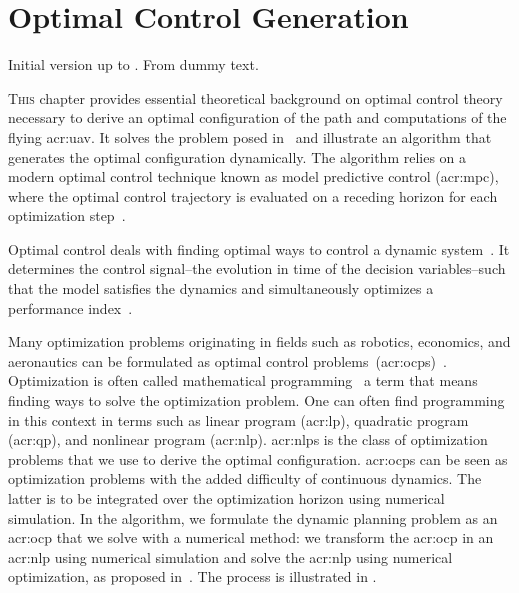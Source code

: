 
\chapter{Optimal Control Generation}
\label{cp:opt}

\begin{highlight}
    \begin{st}
        Initial version up to . From  dummy text.
    \end{st} 
\end{highlight}

\lettrine{T}{his} chapter provides essential theoretical background on optimal control theory necessary to derive an optimal configuration of the path and computations of the flying \Gls{acr:uav}. It solves the problem posed in~ and illustrate an algorithm that generates the optimal configuration dynamically. The algorithm relies on a modern optimal control technique known as model predictive control (\Gls{acr:mpc}), where the optimal control trajectory is evaluated on a receding horizon for each optimization step~\citep{rawlings2017model}. 

Optimal control deals with finding optimal ways to control a dynamic system~\citep{sethi2019optimal}. It determines the control signal--the evolution in time of the decision variables--such that the model satisfies the dynamics and simultaneously optimizes a performance index~\citep{kirk2004optimal}.

Many optimization problems originating in fields such as robotics, economics, and aeronautics can be formulated as optimal control problems~(\Gls{acr:ocp}s)~\citep{von1992direct}. Optimization is often called mathematical programming~\citep{nocedal2006numerical} a term that means finding ways to solve the optimization problem. One can often find programming in this context in terms such as linear program (\Gls{acr:lp}), quadratic program (\Gls{acr:qp}), and nonlinear program (\Gls{acr:nlp}). \Gls{acr:nlp}s is the class of optimization problems that we use to derive the optimal configuration. \Gls{acr:ocp}s can be seen as optimization problems with the added difficulty of continuous dynamics. The latter is to be integrated over the optimization horizon using numerical simulation. In the algorithm, we formulate the dynamic planning problem as an \Gls{acr:ocp} that we solve with a numerical method: we transform the \Gls{acr:ocp} in an \Gls{acr:nlp} using numerical simulation and solve the \Gls{acr:nlp} using numerical optimization, as proposed in~\citep{rawlings2017model}. The process is illustrated in .

